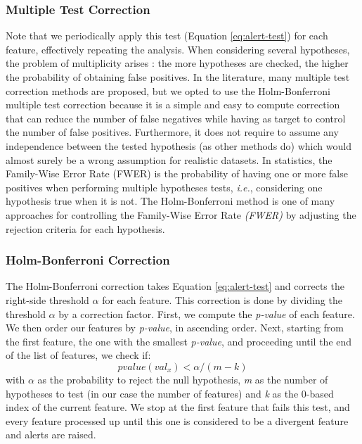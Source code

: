 \documentclass[sigconf]{acmart}
\begin{document}
\subsubsection{Multiple Test Correction} \label{sec:multi-test}
Note that we periodically apply this test (Equation \ref{eq:alert-test}) for each feature, effectively repeating the analysis. When considering several hypotheses, the problem of multiplicity arises \cite{MultiTestProblem-Pubmed, MultiTestProblem-Dickhaus2014, MultiTestProblem-Miller1966, multiple-test-correction-geoffrey}: the more hypotheses are checked, the higher the probability of obtaining false positives. In the literature, many multiple test correction methods are proposed, but we opted to use the Holm-Bonferroni multiple test correction because it is a simple and easy to compute correction that can reduce the number of false negatives while having as target to control the number of false positives. Furthermore, it does not require to assume any independence between the tested hypothesis (as other methods do) which would almost surely be a wrong assumption for realistic datasets. In statistics, the Family-Wise Error Rate (FWER) \cite{MultivariateMT, MultitestTamhane2018AdvancesIP} is the probability of having one or more false positives when performing multiple hypotheses tests, \textit{i.e.}, considering one hypothesis true when it is not. The Holm-Bonferroni method \cite{HolmBonferroni} is one of many approaches for controlling the Family-Wise Error Rate \textit{(FWER)} by adjusting the rejection criteria for each hypothesis.


\subsubsection*{Holm-Bonferroni Correction} \label{sec:holmbonferroni}
The Holm-Bonferroni correction takes Equation \ref{eq:alert-test} and corrects the right-side threshold $\alpha$ for each feature. This correction is done by dividing the threshold $\alpha$ by a correction factor. First, we compute the \textit{p-value} of each feature. We then order our features by \textit{p-value}, in ascending order. Next, starting from the first feature, the one with the smallest \textit{p-value}, and proceeding until the end of the list of features, we check if:
\begin{equation}
    pvalue(val_x) < \alpha / (m - k)
    \label{eq:corrected-pvalue}
\end{equation}
with $\alpha$ as the probability to reject the null hypothesis, \textit{m} as the number of hypotheses to test (in our case the number of features) and \textit{k} as the 0-based index of the current feature. We stop at the first feature that fails this test, and every feature processed up until this one is considered to be a divergent feature and alerts are raised.
\end{document}
